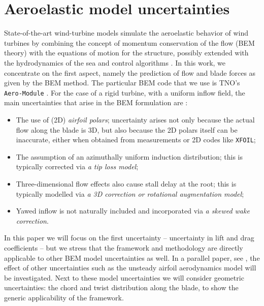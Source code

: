 \section{Aeroelastic model uncertainties}\label{sec:model_description}
State-of-the-art wind-turbine models simulate the aeroelastic behavior of wind turbines by combining the concept of momentum conservation of the flow (BEM theory) with the equations of motion for the structure, possibly extended with the hydrodynamics of the sea and control algorithms \cite{Vorpahl2013}. In this work, we concentrate on the first aspect, namely the prediction of flow and blade forces as given by the BEM method. The particular BEM code that we use is TNO's \texttt{Aero-Module} \cite{Boorsma2012}. For the case of a rigid turbine, with a uniform inflow field, the main uncertainties that arise in the BEM formulation are \cite{Hansen1993}:
\begin{itemize}
\item The use of (2D) \textit{airfoil polars}; uncertainty arises not only because the actual flow along the blade is 3D, but also because the 2D polars itself can be inaccurate, either when obtained from measurements or 2D codes like \texttt{XFOIL};
\item The assumption of an azimuthally uniform induction distribution; this is typically corrected via \textit{a tip loss model};
\item Three-dimensional flow effects also cause stall delay at the root; this is typically modelled via \textit{a 3D correction or rotational augmentation model};
\item Yawed inflow is not naturally included and incorporated via \textit{a skewed wake correction}.
\end{itemize}
In this paper we will focus on the first uncertainty -- uncertainty in lift and drag coefficients -- but we stress that the framework and methodology are directly applicable to other BEM model uncertainties as well. In a parallel paper, see \cite{Caboni2020}, the effect of other uncertainties such as the unsteady airfoil aerodynamics model will be investigated. Next to these model uncertainties we will consider geometric uncertainties: the chord and twist distribution along the blade, to show the generic applicability of the framework.

